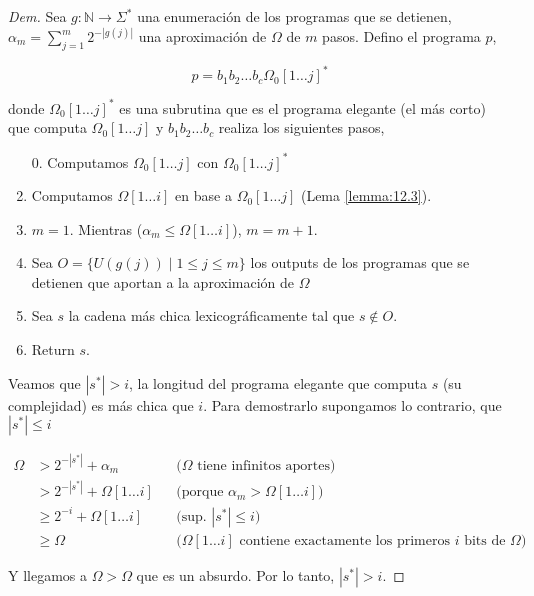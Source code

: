\documentclass{article}
\theoremstyle{definition} %
\newcommand{\first}[2]{#2[1 \dots #1]}
\begin{document}
\begin{proof}[Dem]
    Sea $g: \mathbb{N} \to \Sigma^*$ una enumeración de los programas que se
    detienen, $\alpha_m = \sum_{j = 1}^{m} 2 ^ {-|g(j)|}$ una aproximación de
    $\Omega$ de $m$ pasos. Defino el programa $p$,

    \[
        p = b_1 b_2 \dots b_c \first{j}{\Omega_0}^*
    \]

    donde $\first{j}{\Omega_0}^*$ es una subrutina que es el programa elegante
    (el más corto) que computa $\first{j}{\Omega_0}$ y $b_1 b_2 \dots b_c$
    realiza los siguientes pasos,

    \begin{enumerate}
        \item[0.] Computamos $\first{j}{\Omega_0}$ con
        $\first{j}{\Omega_0}^*$
        \item Computamos $\first{i}{\Omega}$ en base a
        $\first{j}{\Omega_0}$ (Lema \ref{lemma:12.3}).
        \item $m = 1$. Mientras ($\alpha_m \leq \first{i}{\Omega}$), $m = m + 1$.
        \item Sea $O = \{ U(g(j)) \mid 1 \leq j \leq m \}$ los outputs de los
        programas que se detienen que aportan a la aproximación de $\Omega$
        \item Sea $s$ la cadena más chica lexicográficamente tal que $s \notin O$.
        \item Return $s$.
    \end{enumerate}

    Veamos que $|s^*| > i$, la longitud del programa elegante que computa $s$
    (su complejidad) es más chica que $i$. Para demostrarlo supongamos lo
    contrario, que $|s^*| \leq i$

    \begin{align*}
        \Omega 
        &> 2^{-|s^*|} + \alpha_m
            &&\text{($\Omega$ tiene infinitos aportes)}\\
        &> 2^{-|s^*|} + \first{i}{\Omega}
            &&\text{(porque $\alpha_m > \first{i}{\Omega}$)}\\
        &\geq 2^{-i} + \first{i}{\Omega}
            &&\text{(sup. $|s^*| \leq i$)}\\
        &\geq \Omega
            &&\text{($\first{i}{\Omega}$ contiene exactamente los primeros $i$ bits de $\Omega$)}
    \end{align*}

    Y llegamos a $\Omega > \Omega$ que es un absurdo. Por lo tanto, $|s^*| > i$.
    

\end{proof}
\end{document}
